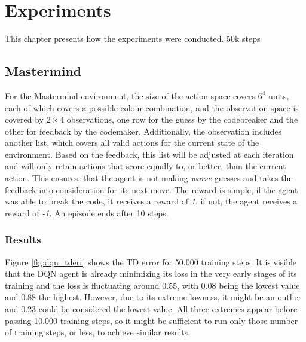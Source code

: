 \chapter{Experiments}
\label{chap:experiments}
This chapter presents how the experiments were conducted.
50k steps



\section{Mastermind}
\label{sec:ex_mastermind}

For the Mastermind environment, the size of the action space covers $6^4$ units, each of which covers a possible colour combination, and the observation space is covered by $2 \times 4$ observations, one row for the guess by the codebreaker and the other for feedback by the codemaker. Additionally, the observation includes another list, which covers all valid actions for the current state of the environment. Based on the feedback, this list will be adjusted at each iteration and will only retain actions that score equally to, or better, than the current action. This ensures, that the agent is not making \textit{worse} guesses  and takes the feedback into consideration for its next move. The reward is simple, if the agent was able to break the code, it receives a reward of \textit{1}, if not, the agent receives a reward of \textit{-1}. An episode ends after 10 steps.

\subsection{Results}
Figure \ref{fig:dqn_tderr} shows the TD error for 50.000 training steps. It is visible that the DQN agent is already minimizing its loss in the very early stages of its training and the loss is fluctuating around 0.55, with 0.08 being the lowest value and 0.88 the highest. However, due to its extreme lowness, it might be an outlier and 0.23 could be considered the lowest value. All three extremes appear before passing 10.000 training steps, so it might be sufficient to run only those number of training steps, or less, to achieve similar results. 

